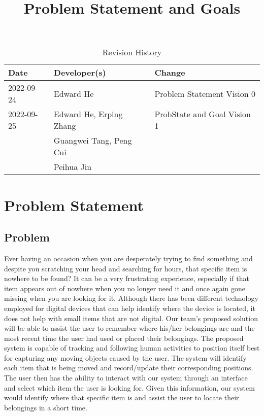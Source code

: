 \documentclass{article}
\title{Problem Statement and Goals\\\progname}
\author{\authname}
\date{}
\begin{document}
\maketitle

\begin{table}[hp]
\caption{Revision History} \label{TblRevisionHistory}
\begin{tabularx}{\textwidth}{llX}
\toprule
\textbf{Date} & \textbf{Developer(s)} & \textbf{Change}\\
\midrule
2022-09-24 & Edward He & Problem Statement Vision 0\\
\hline
2022-09-25 & Edward He, Erping Zhang & ProbState and Goal Vision 1\\
& Guangwei Tang, Peng Cui & \\
& Peihua Jin & \\

\bottomrule
\end{tabularx}
\end{table}

\section{Problem Statement}


\subsection{Problem}
Ever having an occasion when you are desperately trying to find something and despite you scratching your head and searching for hours, that specific item is nowhere to be found? It can be a very frustrating experience, especially if that item appears out of nowhere when you no longer need it and once again gone missing when you are looking for it. Although there has been different technology employed for digital devices that can help identify where the device is located, it does not help with small items that are not digital. Our team's proposed solution will be able to assist the user to remember where his/her belongings are and the most recent time the user had used or placed their belongings. The proposed system is capable of tracking and following human activities to position itself best for capturing any moving objects caused by the user. The system will identify each item that is being moved and record/update their corresponding positions. The user then has the ability to interact with our system through an interface and select which item the user is looking for. Given this information, our system would identify where that specific item is and assist the user to locate their belongings in a short time. 
\end{document}

